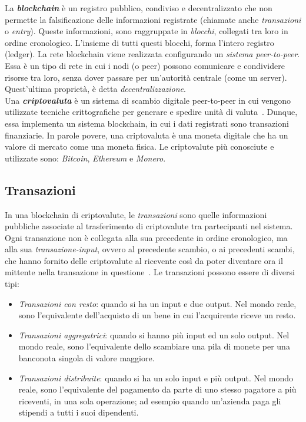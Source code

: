 La \textit{\textbf{blockchain}} \`e un registro pubblico, condiviso e decentralizzato che non permette la falsificazione delle informazioni registrate (chiamate anche \textit{transazioni} o \textit{entry}). Queste informazioni, sono raggruppate in \textit{blocchi}, collegati tra loro in ordine cronologico. L'insieme di tutti questi blocchi, forma l'intero registro (ledger).
La rete blockchain viene realizzata configurando un \textit{sistema peer-to-peer}. Essa \`e un tipo di rete in cui i nodi (o peer) possono comunicare e condividere risorse tra loro, senza dover passare per un'autorità centrale (come un server). Quest'ultima proprietà, \`e detta \textit{decentralizzazione}.\\
Una \textit{\textbf{criptovaluta}} \`e un sistema di scambio digitale peer-to-peer in cui vengono utilizzate tecniche crittografiche per generare e spedire unità di valuta~\cite{art:bc2}. Dunque, essa implementa un sistema blockchain, in cui i dati registrati sono transazioni finanziarie. In parole povere, una criptovaluta \`e una moneta digitale che ha un valore di mercato come una moneta fisica.
Le criptovalute più conosciute e utilizzate sono: \textit{Bitcoin}, \textit{Ethereum} e \textit{Monero}.

\subsection{Transazioni}
In una blockchain di criptovalute, le \textit{transazioni} sono quelle informazioni pubbliche associate al trasferimento di criptovalute tra partecipanti nel sistema. 
Ogni transazione non \`e collegata alla sua precedente in ordine cronologico, ma alla sua \textit{transazione-input}, ovvero al precedente scambio, o ai precedenti scambi, che hanno fornito delle criptovalute al ricevente così da poter diventare ora il mittente nella transazione in questione~\cite{tesi:venezia}.
Le transazioni possono essere di diversi tipi:~\cite{libro:bitcoin}
\begin{itemize}
\item \textit{Transazioni con resto}: quando si ha un input e due output. Nel mondo reale, sono l'equivalente dell'acquisto di un bene in cui l'acquirente riceve un resto.
\item \textit{Transazioni aggregatrici}: quando si hanno più input ed un solo output. Nel mondo reale, sono l'equivalente dello scambiare una pila di monete per una banconota singola di valore maggiore.
\item \textit{Transazioni distribuite}: quando si ha un solo input e più output. Nel mondo reale, sono l'equivalente del pagamento da parte di uno stesso pagatore a più riceventi, in una sola operazione; ad esempio quando un'azienda paga gli stipendi a tutti i suoi dipendenti.
\end{itemize}

